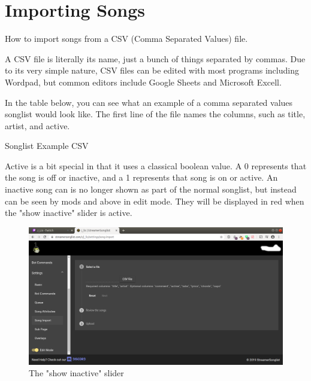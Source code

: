 
\section{Importing Songs}
How to import songs from a CSV (Comma Separated Values) file.

A CSV file is literally its name, just a bunch of things separated by commas. Due to its very simple nature, CSV files can be edited with most programs including Wordpad, but common editors include Google Sheets and Microsoft Excell.

In the table below, you can see what an example of a comma separated values songlist would look like. 
The first line of the file names the columns, such as title, artist, and active. 

\begin{table}[h!]
\caption{Songlist Example CSV}
\label{example.csv}
\end{table}

Active is a bit special in that it uses a classical boolean value. 
A 0 represents that the song is off or inactive, and a 1 represents that song is on or active.
An inactive song can is no longer shown as part of the normal songlist, but instead can be seen by mods and above in edit mode. 
They will be displayed in red when the "show inactive" slider is active.

\begin{figure}[h!]
  \includegraphics[width=\linewidth]{src/songlist_import/import_songs.png}
  \caption{The "show inactive" slider}
  \label{show inactive}
\end{figure}

